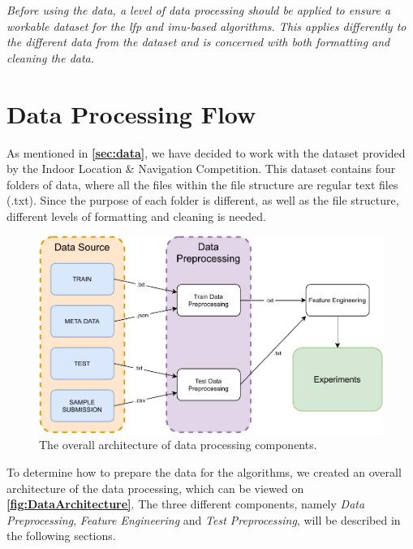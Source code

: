 \textit{Before using the data, a level of data processing should be applied to ensure a workable dataset for the \gls{lfp} and \gls{imu}-based algorithms. This applies differently to the different data from the dataset and is concerned with both formatting and cleaning the data.}

\section{Data Processing Flow}
As mentioned in \textbf{\autoref{sec:data}}, we have decided to work with the dataset provided by the Indoor Location \& Navigation Competition. This dataset contains four folders of data, where all the files within the file structure are regular text files (.txt). Since the purpose of each folder is different, as well as the file structure, different levels of formatting and cleaning is needed.

\begin{figure}[H]
    \centering
    \includegraphics[scale=0.7]{Images/DataStandard/DataArch.pdf}
    \caption{The overall architecture of data processing components.}
    \label{fig:DataArchitecture}
\end{figure}

To determine how to prepare the data for the algorithms, we created an overall architecture of the data processing, which can be viewed on \textbf{\autoref{fig:DataArchitecture}}. The three different components, namely \textit{Data Preprocessing}, \textit{Feature Engineering} and \textit{Test Preprocessing}, will be described in the following sections.


